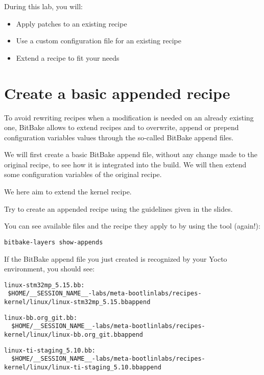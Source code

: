 
During this lab, you will:
\begin{itemize}
  \item Apply patches to an existing recipe
  \item Use a custom configuration file for an existing recipe
  \item Extend a recipe to fit your needs
\end{itemize}

\section{Create a basic appended recipe}

To avoid rewriting recipes when a modification is needed on an already existing
one, BitBake allows to extend recipes and to overwrite, append or prepend
configuration variables values through the so-called BitBake append files.

We will first create a basic BitBake append file, without any change made
to the original recipe, to see how it is integrated into the build. We will then
extend some configuration variables of the original recipe.

We here aim to extend the 
{{}} kernel recipe.

Try to create an appended recipe using the guidelines given in the slides.

You can see available  files and the recipe they apply to by
using the  tool (again!):
\begin{verbatim}
bitbake-layers show-appends
\end{verbatim}

If the BitBake append file you just created is recognized by your Yocto
environment, you should see:
\if{}
\begin{verbatim}
linux-stm32mp_5.15.bb:
 $HOME/__SESSION_NAME__-labs/meta-bootlinlabs/recipes-kernel/linux/linux-stm32mp_5.15.bbappend
\end{verbatim}
\else
  \if{}
\begin{verbatim}
linux-bb.org_git.bb:
  $HOME/__SESSION_NAME__-labs/meta-bootlinlabs/recipes-kernel/linux/linux-bb.org_git.bbappend
\end{verbatim}
  \else
\begin{verbatim}
linux-ti-staging_5.10.bb:
  $HOME/__SESSION_NAME__-labs/meta-bootlinlabs/recipes-kernel/linux/linux-ti-staging_5.10.bbappend
\end{verbatim}
  \fi
\fi

